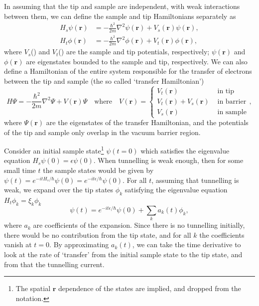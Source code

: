 In assuming that the tip and sample are independent, with weak interactions between them, we can define the sample and tip Hamiltonians separately as
\begin{align}
H_{s}\psi(\pmb{r}) &= -\frac{\hbar^2}{2m} \nabla^2 \psi(\pmb{r}) + V_{s}(\pmb{r}) \psi(\pmb{r}), \\
H_{t}\phi(\pmb{r}) &= -\frac{\hbar^2}{2m} \nabla^2 \phi(\pmb{r}) + V_{t}(\pmb{r}) \phi(\pmb{r}) ,
\end{align}
where $V_s$() and $V_t$() are the sample and tip potentials, respectively; $\psi(\pmb{r})$ and $\phi(\pmb{r})$ are eigenstates bounded to the sample and tip, respectively. We can also define a Hamiltonian of the entire system responsible for the transfer of electrons between the tip and sample (the so called `transfer Hamiltonian')
\begin{equation} \label{eq:exptech:transH}
H\Psi = - \frac{\hbar^2}{2m} \nabla^2 \Psi + V(\pmb{r}) \Psi \quad \textrm{where} \quad V(\pmb{r}) = 
\begin{cases}
V_t(\pmb{r}) & \textrm{ in tip} \\
V_t(\pmb{r}) + V_s(\pmb{r}) & \textrm{ in barrier} \\
V_s(\pmb{r}) & \textrm{ in sample}
\end{cases},
\end{equation}
where $\Psi(\pmb{r})$ are the eigenstates of the transfer Hamiltonian, and the potentials of the tip and sample only overlap in the vacuum barrier region.

\sloppy Consider an initial sample state\footnote{The spatial $\pmb{r}$ dependence of the states are implied, and dropped from the notation.} $\psi(t=0)$ which satisfies the eigenvalue equation $H_{s}\psi(0) = \epsilon \psi(0)$. When tunnelling is weak enough, then for some small time $t$ the sample states would be given by $\psi(t) = e^{-itH_{s}/\hbar} \psi(0) = e^{-it\epsilon/\hbar} \psi(0) $. For all $t$, assuming that tunnelling is weak, we expand over the tip states $\phi_k$ satisfying the eigenvalue equation $H_{t}\phi_k = \xi_k \phi_k$
\begin{equation} \label{eq:exptech:state}
\psi(t) = e^{-it\epsilon/\hbar} \psi(0) + \sum_k a_k(t) \phi_k,
\end{equation}
where $a_k$ are coefficients of the expansion. Since there is no tunnelling initially, there would be no contribution from the tip state, and for all $k$ the coefficients vanish at $t=0$. By approximating $a_k(t)$, we can take the time derivative to look at the rate of `transfer' from the initial sample state to the tip state, and from that the tunnelling current.

